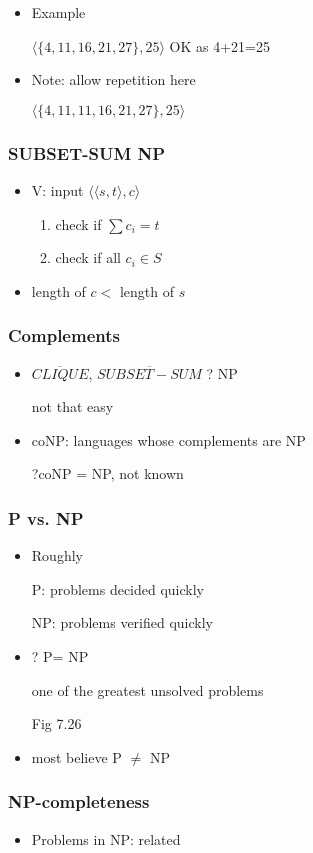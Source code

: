 \begin{frame}[allowframebreaks]
\begin{itemize}
\item Example

$\langle  \{4,11,16,21,27\},25\rangle $ OK
as 4+21=25
\item Note: allow repetition here

$\langle  \{4,11,11,16,21,27\},25\rangle $ 
 \end{itemize}\end{frame} \begin{frame}[allowframebreaks] \frametitle{SUBSET-SUM NP}
  \begin{itemize}
 \item V: input $\langle  \langle  s,t\rangle ,c\rangle $
  \begin{enumerate}
  \item check if $\sum c_i=t$
  \item check if all $c_i \in S$
  \end{enumerate}
\item length of $c <$  length of $s$
\end{itemize}\end{frame} \begin{frame}[allowframebreaks] \frametitle{Complements}
  \begin{itemize}
\item $\overline{CLIQUE}$,
$\overline{SUBSET-SUM}$ ? NP

not that easy

\item coNP: languages whose complements are NP

?coNP = NP, not known
\end{itemize}\end{frame} \begin{frame}[allowframebreaks] \frametitle{P vs. NP}
  \begin{itemize}
\item Roughly

P: problems decided quickly

NP: problems verified quickly
\item ? P= NP

one of the greatest unsolved problems

Fig 7.26

\item most believe P $\neq $ NP
\end{itemize}\end{frame} \begin{frame}[allowframebreaks] \frametitle{NP-completeness}
  \begin{itemize}
\item Problems in NP: related


\end{itemize}
\end{frame}

